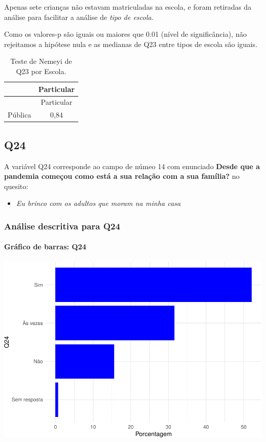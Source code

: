 \documentclass[]{article}
\providecommand{\tightlist}{%
  \setlength{\itemsep}{0pt}\setlength{\parskip}{0pt}}
\let\oldparagraph\paragraph
\renewcommand{\paragraph}[1]{\oldparagraph{#1}\mbox{}}
\begin{document}
Apenas sete crianças não estavam matriculadas na escola, e foram retiradas da análise para facilitar a análise de \emph{tipo de escola}.

Como os valores-p são iguais ou maiores que 0.01 (nível de significância), não rejeitamos a hipótese nula e as medianas de Q23 entre tipos de escola são iguais.

\begin{longtable}[]{@{}lc@{}}
\caption{\label{tab:unnamed-chunk-592}Teste de Nemeyi de Q23 por Escola.}\tabularnewline
\toprule
& Particular\tabularnewline
\midrule
\endfirsthead
\toprule
& Particular\tabularnewline
\midrule
\endhead
Pública & 0,84\tabularnewline
\bottomrule
\end{longtable}

\cleardoublepage

\hypertarget{q24}{%
\subsection{Q24}\label{q24}}

A variável Q24 corresponde ao campo de númeo 14 com enunciado \textbf{Desde que a pandemia começou como está a sua relação com a sua família?} no quesito:

\begin{itemize}
\tightlist
\item
  \emph{Eu brinco com os adultos que moram na minha casa}
\end{itemize}

\hypertarget{anuxe1lise-descritiva-para-q24}{%
\subsubsection{Análise descritiva para Q24}\label{anuxe1lise-descritiva-para-q24}}

\hypertarget{gruxe1fico-de-barras-q24}{%
\paragraph{Gráfico de barras: Q24}\label{gruxe1fico-de-barras-q24}}

\begin{center}\includegraphics[width=0.75\linewidth]{relatorio_covid19_files/figure-latex/unnamed-chunk-599-1} \end{center}
\end{document}
